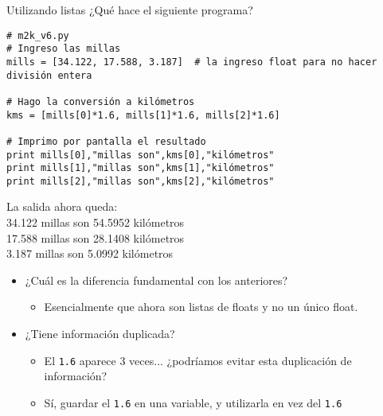 \documentclass[9pt]{beamer}
\begin{document}
\begin{frame}[fragile]{Utilizando listas}
¿Qué hace el siguiente programa?
\footnotesize{\begin{verbatim}
# m2k_v6.py
# Ingreso las millas
mills = [34.122, 17.588, 3.187]  # la ingreso float para no hacer división entera

# Hago la conversión a kilómetros
kms = [mills[0]*1.6, mills[1]*1.6, mills[2]*1.6] 

# Imprimo por pantalla el resultado
print mills[0],"millas son",kms[0],"kilómetros"
print mills[1],"millas son",kms[1],"kilómetros"
print mills[2],"millas son",kms[2],"kilómetros"
	\end{verbatim}}\pause
La salida ahora queda:\\

34.122 millas son 54.5952 kilómetros\\
17.588 millas son 28.1408 kilómetros\\
3.187 millas son 5.0992 kilómetros\\ \pause

\begin{itemize}
	\item ¿Cuál es la diferencia fundamental con los anteriores?\pause
		\begin{itemize}
			\item Esencialmente que ahora son listas de floats y no un único float.
		\end{itemize}\pause	
	\item ¿Tiene información duplicada?\pause
	\begin{itemize}
		\item El \verb|1.6| aparece 3 veces... ¿podríamos evitar esta duplicación de información?\pause
		\item Sí, guardar el \verb|1.6| en una variable, y utilizarla en vez del \verb|1.6|
	\end{itemize}
\end{itemize}

\end{frame}
\end{document}
